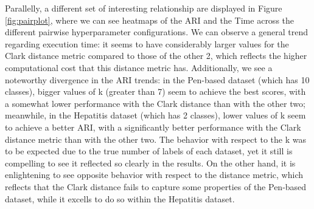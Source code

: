 Parallelly, a different set of interesting relationship are displayed in Figure \ref{fig:pairplot}, where we can see heatmaps of the ARI and the Time across the different pairwise hyperparameter configurations. We can observe a general trend regarding execution time: it seems to have considerably larger values for the Clark distance metric compared to those of the other 2, which reflects the higher computational cost that this distance metric has. Additionally, we see a noteworthy divergence in the ARI trends: in the Pen-based dataset (which has 10 classes), bigger values of k (greater than 7) seem to achieve the best scores, with a somewhat lower performance with the Clark distance than with the other two; meanwhile, in the Hepatitis dataset (which has 2 classes), lower values of k seem to achieve a better ARI, with a significantly better performance with the Clark distance metric than with the other two. The behavior with respect to the k was to be expected due to the true number of labels of each dataset, yet it still is compelling to see it reflected so clearly in the results. On the other hand, it is enlightening to see opposite behavior with respect to the distance metric, which reflects that the Clark distance fails to capture some properties of the Pen-based dataset, while it excells to do so within the Hepatitis dataset.

